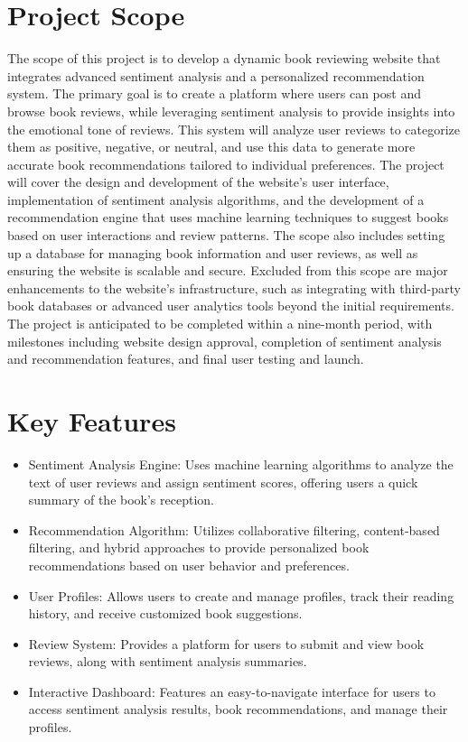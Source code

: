 \section{Project Scope}
The scope of this project is to develop a dynamic book reviewing website that integrates advanced sentiment analysis and a personalized recommendation system. The primary goal is to create a platform where users can post and browse book reviews, while leveraging sentiment analysis to provide insights into the emotional tone of reviews. This system will analyze user reviews to categorize them as positive, negative, or neutral, and use this data to generate more accurate book recommendations tailored to individual preferences. The project will cover the design and development of the website's user interface, implementation of sentiment analysis algorithms, and the development of a recommendation engine that uses machine learning techniques to suggest books based on user interactions and review patterns. The scope also includes setting up a database for managing book information and user reviews, as well as ensuring the website is scalable and secure. Excluded from this scope are major enhancements to the website's infrastructure, such as integrating with third-party book databases or advanced user analytics tools beyond the initial requirements. The project is anticipated to be completed within a nine-month period, with milestones including website design approval, completion of sentiment analysis and recommendation features, and final user testing and launch.

\section{Key Features}
\begin{itemize}
	\item Sentiment Analysis Engine: Uses machine learning algorithms to analyze the text of user reviews and assign sentiment scores, offering users a quick summary of the book's reception.
	\item Recommendation Algorithm: Utilizes collaborative filtering, content-based filtering, and hybrid approaches to provide personalized book recommendations based on user behavior and preferences.
	\item User Profiles: Allows users to create and manage profiles, track their reading history, and receive customized book suggestions.
	\item Review System: Provides a platform for users to submit and view book reviews, along with sentiment analysis summaries.
	\item Interactive Dashboard: Features an easy-to-navigate interface for users to access sentiment analysis results, book recommendations, and manage their profiles.

\end{itemize}

